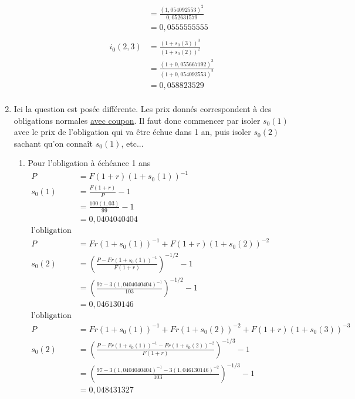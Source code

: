 \begin{enumerate}
\begin{enumerate}[label=\alph*)]
\begin{align*}
                & = \frac{(1,054092553)^2}{0,052631579} \\
                & = 0,0555555555 \\
      \\
      i_0(2,3)  & = \frac{(1+s_0(3))^3}{(1+s_0(2))^2} \\
                & = \frac{(1+0,055667192)^3}{(1+0,054092553)^2} \\
                & = 0,058823529 \\
    \end{align*}
  \end{enumerate} %
  \item Ici la question est posée différente. Les prix donnés correspondent à
  des obligations normales \underline{avec coupon}.
  \p
  Il faut donc commencer par isoler $s_0(1)$ avec le prix de l'obligation qui
  va être échue dans 1 an, puis isoler $s_0(2)$ sachant qu'on connaît $s_0(1)$, etc...
  \begin{enumerate}[label=\alph*)]
    \item Pour l'obligation à échéance 1 ans
    \begin{align*}
      P       & = F(1+r)(1+s_0(1))^{-1} \\
      s_0(1)  & = \frac{F(1+r)}{P} -1 \\
              & = \frac{100(1,03)}{99}  -1\\
              & = 0,0404040404 \\
      \text{l'obligation 2 ans ...}\\
      P       & = Fr(1+s_0(1))^{-1} + F(1+r)(1+s_0(2))^{-2} \\
      s_0(2)  & = \left( \frac{P - Fr(1+s_0(1))^{-1}}{F(1+r)} \right)^{-1/2} - 1 \\
              & = \left( \frac{97 - 3(1,0404040404)^{-1}}{103} \right)^{-1/2} - 1 \\
              & = 0,046130146 \\
      \text{l'obligation 3 ans ...}\\
      P       & = Fr(1+s_0(1))^{-1} + Fr(1+s_0(2))^{-2} + F(1+r)(1+s_0(3))^{-3} \\
      s_0(2)  & = \left( \frac{P - Fr(1+s_0(1))^{-1} - Fr(1+s_0(2))^{-2}}{F(1+r)} \right)^{-1/3} - 1 \\
              & = \left( \frac{97 - 3(1,0404040404)^{-1}- 3(1,046130146)^{-2}}{103} \right)^{-1/3} - 1 \\
              & = 0,048431327 \\
    \end{align*}

\end{enumerate}
\end{enumerate}
